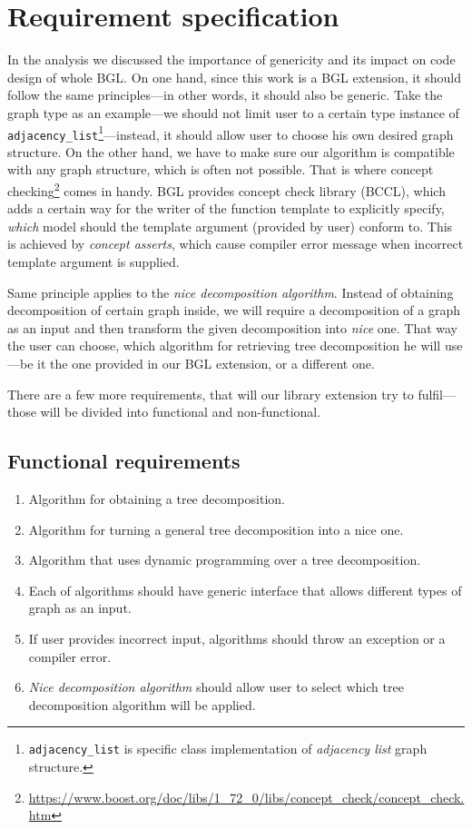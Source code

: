 \documentclass[thesis=B,english]{FITthesis}[2019/03/21]
\begin{document}
\section{Requirement specification}\label{sec:requirment_specification}
In the analysis we discussed the importance of genericity and its impact on code design of whole BGL. On one hand, since this work is a BGL extension, it should follow the same principles---in other words, it should also be generic. Take the graph type as an example---we should not limit user to a certain type instance of \texttt{adjacency\_list}\footnote{\texttt{adjacency\_list} is specific class implementation of \emph{adjacency list} graph structure.}---instead, it should allow user to choose his own desired graph structure. On the other hand, we have to make sure our algorithm is compatible with any graph structure, which is often not possible. That is where concept checking\footnote{\url{https://www.boost.org/doc/libs/1_72_0/libs/concept_check/concept_check.htm}} comes in handy. BGL provides concept check library (BCCL), which adds a certain way for the writer of the function template to explicitly specify, \emph{which} model should the template argument (provided by user) conform to. This is achieved by \emph{concept asserts}, which cause compiler error message when incorrect template argument is supplied.

Same principle applies to the \emph{nice decomposition algorithm}. Instead of obtaining decomposition of certain graph inside, we will require a decomposition of a graph as an input and then transform the given decomposition into \emph{nice} one. That way the user can choose, which algorithm for retrieving tree decomposition he will use---be it the one provided in our BGL extension, or a different one.

There are a few more requirements, that will our library extension try to fulfil---those will be divided into functional and non-functional.

\subsection{Functional requirements}
\begin{enumerate}[F1)]
	\item Algorithm for obtaining a tree decomposition.
	\item Algorithm for turning a general tree decomposition into a nice one.
	\item Algorithm that uses dynamic programming over a tree decomposition.
	\item Each of algorithms should have generic interface that allows different types of graph as an input.
	\item If user provides incorrect input, algorithms should throw an exception or a compiler error.
	\item \emph{Nice decomposition algorithm} should allow user to select which tree decomposition algorithm will be applied.
\end{enumerate}
\end{document}
